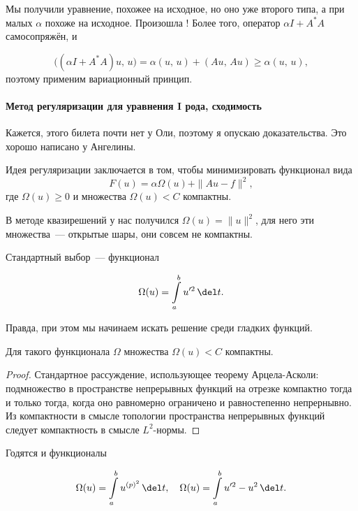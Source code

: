 \documentclass{trlnotes}
\begin{document}
    Мы получили уравнение, похожее на исходное, но оно уже второго типа, а при малых $\alpha$ похоже на исходное. Произошла ! Более того, оператор $\alpha I + A^*A$ самосопряжён, и

    \[
        \big((\alpha I + A^*A)u, \, u\big) = \alpha(u, \, u) + (Au, \, Au) \geqslant \alpha(u, \, u),
    \]
    поэтому применим вариационный принцип.

\paragraph{Метод регуляризации для уравнения I рода, сходимость}

    \begin{rem}
        Кажется, этого билета почти нет у Оли, поэтому я опускаю доказательства. Это хорошо написано у Ангелины.
    \end{rem}

    Идея регуляризации заключается в том, чтобы минимизировать функционал вида
    \[
        F(u) = \alpha \Omega(u) + \|Au - f\|^2,
    \]
    где $\Omega(u) \geqslant 0$ и множества $\Omega(u) < C$ компактны.

    \begin{rem}
        В методе квазирешений у нас получился $\Omega(u) = \|u\|^2$, для него эти множества~--- открытые шары, они совсем не компактны.
    \end{rem}

    Стандартный выбор~--- функционал

    \[
        \Omega(u) = \int\limits_a^b u'^2 \, \del t.
    \]

    Правда, при этом мы начинаем искать решение среди гладких функций.

    \begin{st}
        Для такого функционала $\Omega$ множества $\Omega(u) < C$ компактны.
        \begin{proof}
            Стандартное рассуждение, использующее теорему Арцела-Асколи: подмножество в пространстве непрерывных функций на отрезке компактно тогда и только тогда, когда оно равномерно ограничено и равностепенно непрернывно. Из компактности в смысле топологии пространства непрерывных функций следует компактность в смысле $L^2$-нормы.
        \end{proof}
    \end{st}

    Годятся и функционалы

    \[
        \Omega(u) = \int\limits_a^b u^{(p)^2} \, \del t, \quad \Omega(u) = \int\limits_a^b u'^2 - u^2 \, \del t.
    \]
\end{document}

